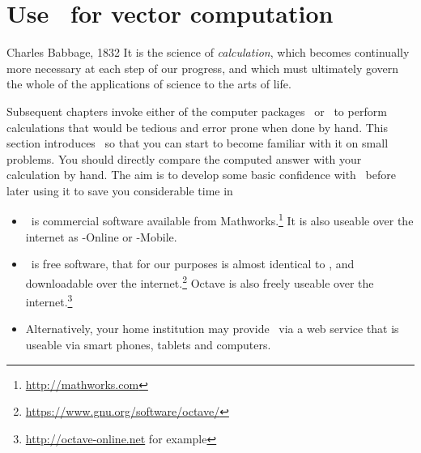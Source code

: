 

\section{Use \script\ for vector computation}
\label{sec:umovc}


\begin{quoted}{Charles Babbage, 1832}
It is the science of \emph{calculation}, which becomes continually more necessary at each step of our progress, and which must ultimately govern the whole of the applications of science to the arts of life.
\end{quoted}

Subsequent chapters invoke either of the computer packages \script[1]\ or \script[2]\ to perform calculations that would be tedious and error prone when done by hand.
This section introduces \script\ so that you can start to become familiar with it on small problems.
You should directly compare the computed answer with your calculation by hand.
The aim is to develop some basic confidence with \script\ before later using it to save you considerable time in 

\begin{itemize}
\item  \script[1]\ is commercial software available from Mathworks.\footnote{\url{http://mathworks.com}}
It is also useable over the internet as \script[1]-Online or \script[1]-Mobile.
\item \script[2]\ is free software, that for our purposes is almost identical to \script[1], and downloadable over the internet.\footnote{\url{https://www.gnu.org/software/octave/}}
Octave is also freely useable over the internet.\footnote{\url{http://octave-online.net} for example} 
\item Alternatively, your home institution may provide \script\ via a web service that is useable via smart phones, tablets and computers.
\end{itemize}



\begin{comment}
Avoid plotting because I do not want to confuse a vector with a row vector of plot points.  Plotting is not high priority except for a few application sections.
\end{comment}



